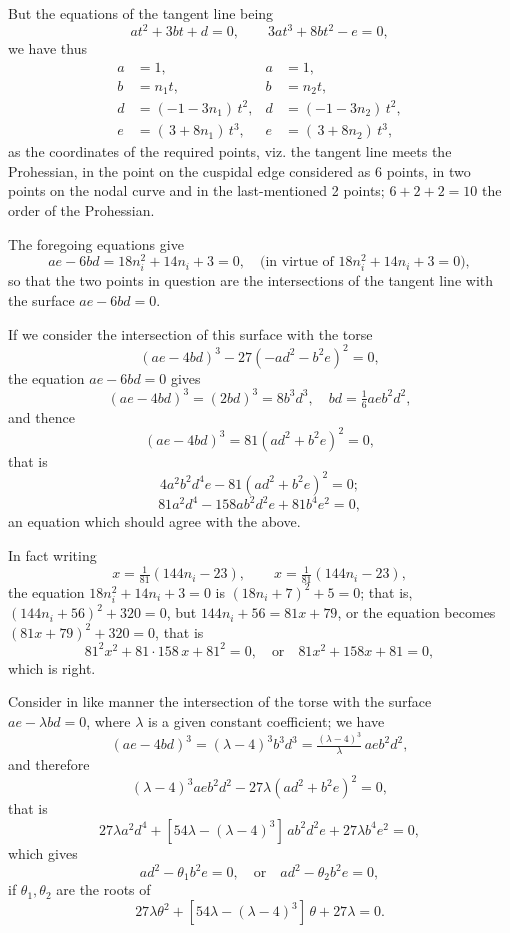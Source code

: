 \documentclass[11pt]{article}
\begin{document}
But the equations of the tangent line being
\[ a t^2 + 3 b t + d = 0,\qquad 3 a t^3 + 8 b t^2 - e = 0, \]
we have thus
\begin{align*}
a &= 1, & a &= 1,\\
b &= n_1 t, & b &= n_2 t,\\
d &= (-1 - 3n_1)\,t^2, & d &= (-1 - 3n_2)\,t^2,\\
e &= (\,3 + 8n_1)\,t^3, & e &= (\,3 + 8n_2)\,t^3,
\end{align*}
as the coordinates of the required points, viz. the tangent line meets the Prohessian, in the point on the cuspidal edge considered as 6 points, in two points on the nodal curve and in the last-mentioned 2 points; $6 + 2 + 2 = 10$ the order of the Prohessian.

The foregoing equations give
\[ ae - 6bd = 18 n_i^2 + 14 n_i + 3 = 0,\quad \text{(in virtue of } 18 n_i^2 + 14 n_i + 3 = 0), \]
so that the two points in question are the intersections of the tangent line with the surface $ae - 6bd = 0$.

If we consider the intersection of this surface with the torse
\[ (ae - 4bd)^3 - 27(-ad^2 - b^2 e)^2 = 0, \]
the equation $ae - 6bd = 0$ gives
\[ (ae - 4bd)^3 = (2bd)^3 = 8 b^3 d^3,\quad bd = \tfrac{1}{6}aeb^2 d^2, \]
and thence
\[ (ae - 4bd)^3 = 81(ad^2 + b^2 e)^2 = 0, \]
that is
\[ 4a^2 b^2 d^4 e - 81(ad^2 + b^2 e)^2 = 0; \]
\[ 81a^2 d^4 - 158 a b^2 d^2 e + 81 b^4 e^2 = 0, \]
an equation which should agree with the above.

In fact writing
\[ x = \tfrac{1}{81}(144 n_i - 23),\qquad x = \tfrac{1}{81}(144 n_i - 23), \]
the equation $18 n_i^2 + 14 n_i + 3 = 0$ is $(18 n_i + 7)^2 + 5 = 0$; that is, $(144 n_i + 56)^2 + 320 = 0$, but $144 n_i + 56 = 81 x + 79$, or the equation becomes $(81 x + 79)^2 + 320 = 0$, that is
\[ 81^2 x^2 + 81\cdot 158\,x + 81^2 = 0,\quad \text{or}\quad 81 x^2 + 158 x + 81 = 0, \]
which is right.

Consider in like manner the intersection of the torse with the surface $ae - \lambda bd = 0$, where $\lambda$ is a given constant coefficient; we have
\[ (ae - 4bd)^3 = (\lambda - 4)^3 b^3 d^3 = \tfrac{(\lambda - 4)^3}{\lambda}\,a e b^2 d^2, \]
and therefore
\[ (\lambda - 4)^3 a e b^2 d^2 - 27\lambda(ad^2 + b^2 e)^2 = 0, \]
that is
\[ 27\lambda a^2 d^4 + [54\lambda - (\lambda - 4)^3]\,a b^2 d^2 e + 27\lambda b^4 e^2 = 0, \]
which gives
\[ ad^2 - \theta_1 b^2 e = 0,\quad \text{or}\quad ad^2 - \theta_2 b^2 e = 0, \]
if $\theta_1, \theta_2$ are the roots of
\[ 27\lambda \theta^2 + [54\lambda - (\lambda - 4)^3]\,\theta + 27\lambda = 0. \]
\end{document}

